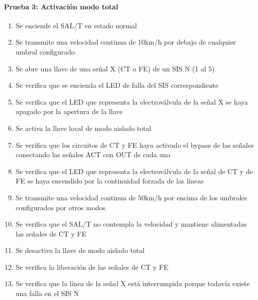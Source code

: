 \paragraph{Prueba 3: Activación modo total}
\begin{enumerate}
\item	Se enciende el SAL/T en estado normal
\item	Se transmite una velocidad continua de 10km/h por debajo de cualquier umbral configurado
\item	Se abre una llave de una señal X (CT o FE) de un SIS N (1 al 5)
\item	Se verifica que se encienda el LED de falla del SIS correspondiente
\item	Se verifica que el LED que representa la electroválvula de la señal X se haya apagado por la apertura de la llave
\item	Se activa la llave local de modo aislado total
\item	Se verifica que los circuitos de CT y FE haya activado el bypass de las señales conectando las señales ACT con OUT de cada una
\item	Se verifica que el LED que representa la electroválvula de la señal de CT y de FE se haya encendido por la continuidad forzada de las líneas
\item	Se transmite una velocidad continua de 50km/h por encima de los umbrales configurados por otros modos
\item	Se verifica que el SAL/T no contempla la velocidad y mantiene alimentadas las señales de CT y FE
\item	Se desactiva la llave de modo aislado total
\item	Se verifica la liberación de las señales de CT y FE
\item	Se verifica que la línea de la señal X está interrumpida porque todavía existe una falla en el SIS N

\end{enumerate}

